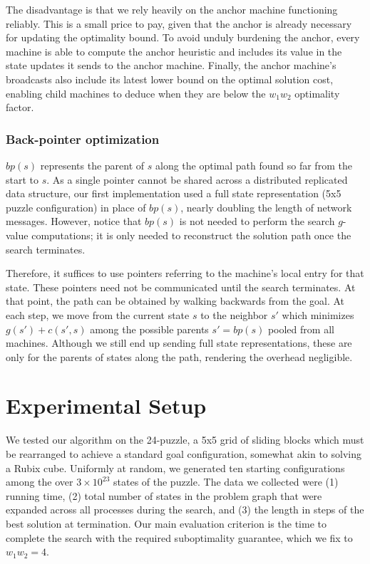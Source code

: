 \documentclass[11pt]{article}
\begin{document}
{The disadvantage is that we rely heavily on the anchor machine functioning reliably. This is a small price to pay, given that the anchor is already necessary for updating the optimality bound. To avoid unduly burdening the anchor, every machine is able to compute the anchor heuristic and includes its value in the state updates it sends to the anchor machine. Finally, the anchor machine's broadcasts also include its latest lower bound on the optimal solution cost, enabling child machines to deduce when they are below the $w_1w_2$ optimality factor.

\subsubsection*{Back-pointer optimization}

$bp(s)$ represents the parent of $s$ along the optimal path found so far from the start to $s$. As a single pointer cannot be shared across a distributed replicated data structure, our first implementation used a full state representation (5x5 puzzle configuration) in place of $bp(s)$, nearly doubling the length of network messages. However, notice that $bp(s)$ is not needed to perform the search $g$-value computations; it is only needed to reconstruct the solution path once the search terminates.

Therefore, it suffices to use pointers referring to the machine's local entry for that state. These pointers need not be communicated until the search terminates. At that point, the path can be obtained by walking backwards from the goal. At each step, we move from the current state $s$ to the neighbor $s'$ which minimizes $g(s') + c(s',s)$ among the possible parents $s'=bp(s)$ pooled from all machines. Although we still end up sending full state representations, these are only for the parents of states along the path, rendering the overhead negligible.

\section{Experimental Setup}

We tested our algorithm on the 24-puzzle, a 5x5 grid of sliding blocks which must be rearranged to achieve a standard goal configuration, somewhat akin to solving a Rubix cube. Uniformly at random, we generated ten starting configurations among the over $3\times 10^{23}$ states of the puzzle. The data we collected were (1) running time, (2) total number of states in the problem graph that were expanded across all processes during the search, and (3) the length in steps of the best solution at termination. Our main evaluation criterion is the time to complete the search with the required suboptimality guarantee, which we fix to $w_1 w_2 = 4$.

}
\end{document}
